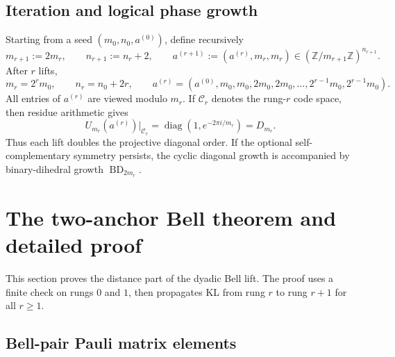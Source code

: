\documentclass[11pt]{article}
\newcommand{\Z}{\mathbb Z}
\newcommand{\diag}{\operatorname{diag}}
\newcommand{\BD}{\operatorname{BD}}
\begin{document}
\subsection{Iteration and logical phase growth}

Starting from a seed $(m_0,n_0,a^{(0)})$, define recursively
\begin{equation}
  m_{r+1}:=2m_r,
  \qquad
  n_{r+1}:=n_r+2,
  \qquad
  a^{(r+1)}:=(a^{(r)},m_r,m_r)\in(\Z/m_{r+1}\Z)^{n_{r+1}}.
  \label{eq:iterated-update}
\end{equation}
After $r$ lifts,
\begin{equation}
  m_r=2^r m_0,
  \qquad
  n_r=n_0+2r,
  \qquad
  a^{(r)}=(a^{(0)},m_0,m_0,2m_0,2m_0,\ldots,2^{r-1}m_0,2^{r-1}m_0).
  \label{eq:iterated-angle-vector}
\end{equation}
All entries of $a^{(r)}$ are viewed modulo $m_r$.  If $\mathcal C_r$ denotes the rung-$r$ code
space, then residue arithmetic gives
\begin{equation}
  U_{m_r}(a^{(r)})\big|_{\mathcal C_r}=\diag(1,e^{-2\pi i/m_r})=D_{m_r}.
  \label{eq:rung-r-diagonal}
\end{equation}
Thus each lift doubles the projective diagonal order.  If the optional self-complementary symmetry
persists, the cyclic diagonal growth is accompanied by binary-dihedral growth
$\BD_{2m_r}$.

\section{The two-anchor Bell theorem and detailed proof}
\label{sec:bell-proof}

This section proves the distance part of the dyadic Bell lift.  The proof uses a finite check on
rungs $0$ and $1$, then propagates KL from rung $r$ to rung $r+1$ for all $r\ge1$.

\subsection{Bell-pair Pauli matrix elements}
\end{document}
